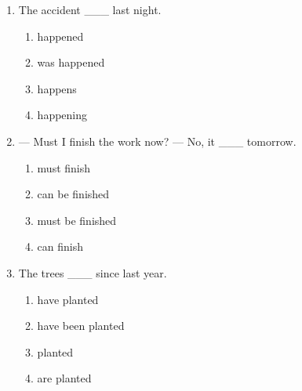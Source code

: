 \documentclass[11pt,a4paper]{ctexart}
\begin{document}
\begin{enumerate}[leftmargin=*,itemsep=4pt]
\begin{enumerate}[label=\Alph*.,leftmargin=2em,itemsep=1pt,topsep=2pt]
\item is connected
\item connected
\item connecting
\end{enumerate}
\item The accident \_\_\_ last night.
\begin{enumerate}[label=\Alph*.,leftmargin=2em,itemsep=1pt,topsep=2pt]
\item happened
\item was happened
\item happens
\item happening
\end{enumerate}
\item — Must I finish the work now? — No, it \_\_\_ tomorrow.
\begin{enumerate}[label=\Alph*.,leftmargin=2em,itemsep=1pt,topsep=2pt]
\item must finish
\item can be finished
\item must be finished
\item can finish
\end{enumerate}
\item The trees \_\_\_ since last year.
\begin{enumerate}[label=\Alph*.,leftmargin=2em,itemsep=1pt,topsep=2pt]
\item have planted
\item have been planted
\item planted
\item are planted
\end{enumerate}
\end{enumerate}

\newpage
\end{document}
